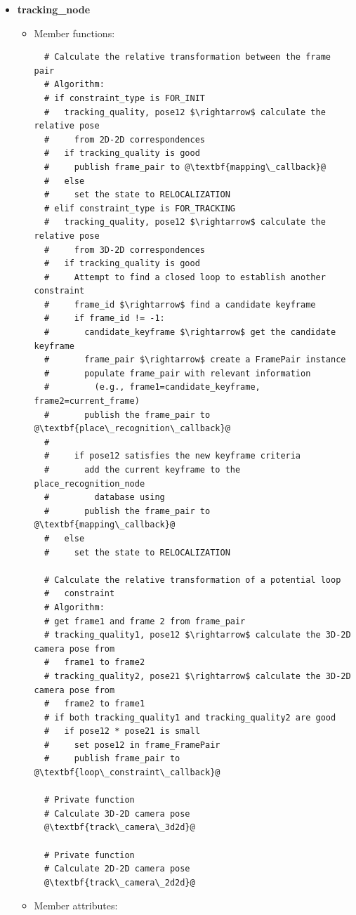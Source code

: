 \begin{itemize}
  \item \textbf{tracking\_node}
  \begin{itemize}
    \item Member functions:
\begin{lstlisting}
  # Calculate the relative transformation between the frame pair
  # Algorithm:
  # if constraint_type is FOR_INIT
  #   tracking_quality, pose12 $\rightarrow$ calculate the relative pose 
  #     from 2D-2D correspondences
  #   if tracking_quality is good
  #     publish frame_pair to @\textbf{mapping\_callback}@
  #   else
  #     set the state to RELOCALIZATION
  # elif constraint_type is FOR_TRACKING
  #   tracking_quality, pose12 $\rightarrow$ calculate the relative pose 
  #     from 3D-2D correspondences
  #   if tracking_quality is good
  #     Attempt to find a closed loop to establish another constraint
  #     frame_id $\rightarrow$ find a candidate keyframe
  #     if frame_id != -1:
  #       candidate_keyframe $\rightarrow$ get the candidate keyframe
  #       frame_pair $\rightarrow$ create a FramePair instance
  #       populate frame_pair with relevant information 
  #         (e.g., frame1=candidate_keyframe, frame2=current_frame)
  #       publish the frame_pair to @\textbf{place\_recognition\_callback}@
  #     
  #     if pose12 satisfies the new keyframe criteria
  #       add the current keyframe to the place_recognition_node  
  #         database using 
  #       publish the frame_pair to @\textbf{mapping\_callback}@
  #   else
  #     set the state to RELOCALIZATION

  # Calculate the relative transformation of a potential loop 
  #   constraint
  # Algorithm:
  # get frame1 and frame 2 from frame_pair
  # tracking_quality1, pose12 $\rightarrow$ calculate the 3D-2D camera pose from 
  #   frame1 to frame2
  # tracking_quality2, pose21 $\rightarrow$ calculate the 3D-2D camera pose from 
  #   frame2 to frame1
  # if both tracking_quality1 and tracking_quality2 are good
  #   if pose12 * pose21 is small
  #     set pose12 in frame_FramePair
  #     publish frame_pair to @\textbf{loop\_constraint\_callback}@

  # Private function
  # Calculate 3D-2D camera pose
  @\textbf{track\_camera\_3d2d}@

  # Private function
  # Calculate 2D-2D camera pose
  @\textbf{track\_camera\_2d2d}@
\end{lstlisting}

    \item Member attributes:
\begin{lstlisting}


\end{lstlisting}
\end{itemize}
\end{itemize}
